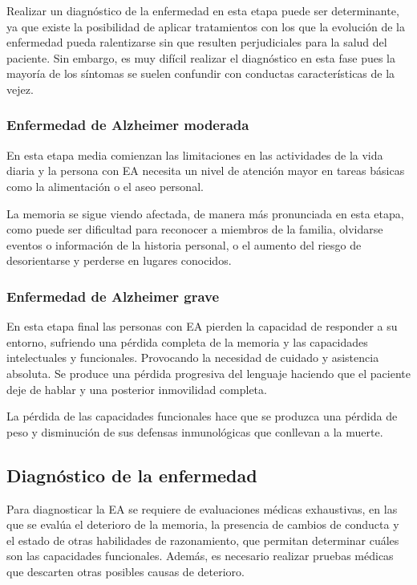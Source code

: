 Realizar un diagnóstico de la enfermedad en esta etapa puede ser determinante, ya que existe la posibilidad de aplicar
tratamientos con los que la evolución de la enfermedad pueda ralentizarse sin que resulten perjudiciales para la salud
del paciente.
Sin embargo, es muy difícil realizar el diagnóstico en esta fase pues la mayoría de los síntomas se suelen confundir con
conductas características de la vejez.

\subsubsection{Enfermedad de Alzheimer moderada}\label{subsubsec:etapa-media-EA}
En esta etapa media comienzan las limitaciones en las actividades de la vida diaria y la persona con EA necesita un
nivel de atención mayor en tareas básicas como la alimentación o el aseo personal.

La memoria se sigue viendo afectada, de manera más pronunciada en esta etapa, como puede ser dificultad para reconocer a
miembros de la familia, olvidarse eventos o información de la historia personal, o el aumento del riesgo de
desorientarse y perderse en lugares conocidos.

\subsubsection{Enfermedad de Alzheimer grave}\label{subsubsec:etapa-final-EA}
En esta etapa final las personas con EA pierden la capacidad de responder a su entorno, sufriendo una pérdida completa
de la memoria y las capacidades intelectuales y funcionales.
Provocando la necesidad de cuidado y asistencia absoluta.
Se produce una pérdida progresiva del lenguaje haciendo que el paciente deje de hablar y una posterior inmovilidad
completa.

La pérdida de las capacidades funcionales hace que se produzca una pérdida de peso y disminución de sus defensas
inmunológicas que conllevan a la muerte.

\subsection{Diagnóstico de la enfermedad}\label{subsec:diagnostico-enfermedad}
Para diagnosticar la EA se requiere de evaluaciones médicas exhaustivas, en las que se evalúa el deterioro de la memoria,
la presencia de cambios de conducta y el estado de otras habilidades de razonamiento, que permitan determinar cuáles son
las capacidades funcionales.
Además, es necesario realizar pruebas médicas que descarten otras posibles causas de deterioro.

